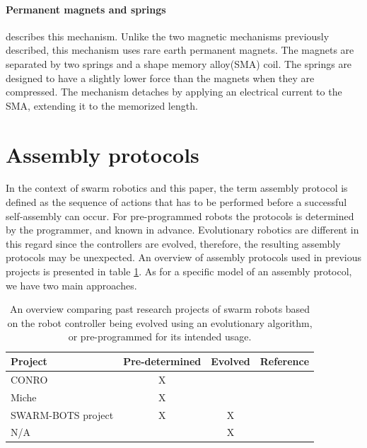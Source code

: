 \paragraph*{Permanent magnets and springs }
\cite{murata_hardware_2000} describes this mechanism.
Unlike the two magnetic mechanisms previously described, this mechanism uses rare earth permanent magnets.
The magnets are separated by two springs and a shape memory alloy(SMA) coil.
The springs are designed to have a slightly lower force than the magnets when they are compressed.
The mechanism detaches by applying an electrical current to the SMA, extending it to the memorized length.


\section{Assembly protocols}
\label{sec:protocol}
In the context of swarm robotics and this paper, the term assembly protocol is defined as the sequence of actions that has to be performed before a successful self-assembly can occur. 
For pre-programmed robots the protocols is determined by the programmer, and known in advance.
Evolutionary robotics are different in this regard since the controllers are evolved, therefore, the resulting assembly protocols may be unexpected. 
An overview of assembly protocols used in previous projects is presented in table \ref{tab:protocols}.
As for a specific model of an assembly protocol, we have two main approaches. 

\begin{table}[H]
	\centering
	\begin{tabular}{@{}  l  c  c  l @{}}
		\toprule
		Project & Pre-determined & Evolved & Reference\\ \midrule
		CONRO & X & & \cite{castano_conro:_2000}\\ 
		Miche & X & & \cite{gilpin_miche:_2008}\\ 
		SWARM-BOTS project & X & X & \cite{gross_object_2006, trianni_evolving_2004}\\ 
		N/A & & X & \cite{weel_emergence_2012}\\ \bottomrule
	\end{tabular}
	\caption{An overview comparing past research projects of swarm robots based on the robot controller being evolved using an evolutionary algorithm, or pre-programmed for its intended usage.}
	
	\label{tab:protocols}
\end{table}

